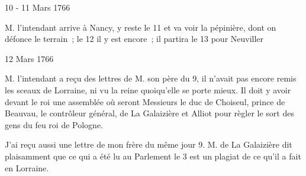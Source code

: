                     \begin{diary}{10 - 11 Mars 1766}{}
                        
                        
                           M. l'intendant arrive à Nancy, y reste
                           le 11 et va voir la pépinière, dont on
                           défonce le terrain ; le 12 il y est
                           encore ;
                           il partira le 13 pour Neuviller
                        \bigskip
        
        
                     \end{diary}
                     
                     \begin{diary}{12 Mars 1766}{}
                        
                        
                           M. l'intendant a reçu des lettres
                           de M.
                              son père du 9, il
                           n'avait pas encore remis
                           les sceaux de Lorraine, ni
                           vu la reine
                           quoiqu'elle se porte mieux. Il doit y avoir
                           devant le roi une assemblée où
                           seront Messieurs
                           le duc de Choiseul, prince de Beauvau,
                           le contrôleur général, de La
                              Galaizière et
                           Alliot pour règler le sort des
                           gens du
                           feu roi de Pologne.
                        \bigskip
        
        
                         J'ai reçu aussi une lettre de mon
                              frère
                           du même jour 9. M. de La Galaizière dit
                           plaisamment que ce qui a été lu au
                           Parlement
                           le 3 est un plagiat de ce qu'il
                           a fait en Lorraine. \bigskip
        
        
                     \end{diary}

